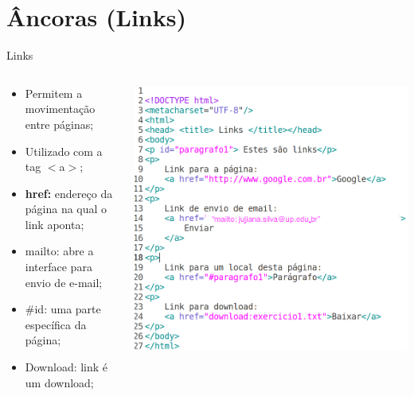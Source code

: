 \documentclass{beamer}
\begin{document}
\section{Âncoras (Links)}
\begin{frame}{Links}
  
  \begin{columns}
    \begin{column}{0.45 \textwidth}
  
      \begin{itemize}
      \item Permitem a movimentação entre páginas;
       \item Utilizado com a tag $<$a$>$;
       \item \textbf{href:} endereço da página na qual o link 
aponta; 
       \item mailto: abre a interface para envio de e-mail;
       \item \#id: uma parte específica da página;
       \item Download: link é um download;
     \end{itemize}
    \end{column}
    \begin{column}{0.5\textwidth}
     \includegraphics[height=0.6\paperheight]{fig/aula1/html6.png}
    \end{column}
  \end{columns}
\end{frame}
\end{document}
